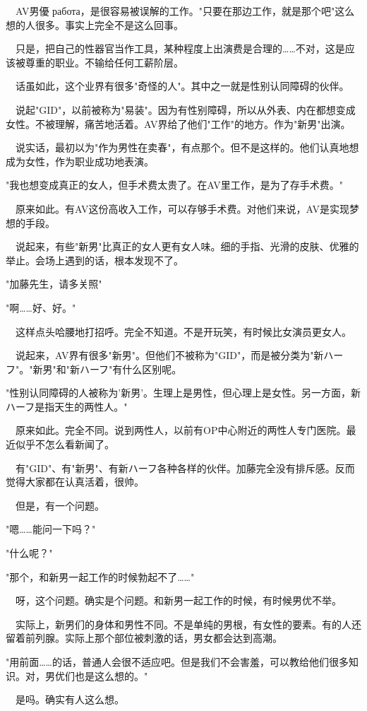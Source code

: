 \documentclass[12pt,UTF8]{ctexbook}
\begin{document}
{{　AV男優 работа，是很容易被误解的工作。"只要在那边工作，就是那个吧"这么想的人很多。事实上完全不是这么回事。

　只是，把自己的性器官当作工具，某种程度上出演费是合理的……不对，这是应该被尊重的职业。不输给任何工薪阶层。

　话虽如此，这个业界有很多"奇怪的人"。其中之一就是性别认同障碍的伙伴。

　说起"GID"，以前被称为"易装"。因为有性别障碍，所以从外表、内在都想变成女性。不被理解，痛苦地活着。AV界给了他们"工作"的地方。作为"新男"出演。

　说实话，最初以为"作为男性在卖春"，有点那个。但不是这样的。他们认真地想成为女性，作为职业成功地表演。

"我也想变成真正的女人，但手术费太贵了。在AV里工作，是为了存手术费。"

　原来如此。有AV这份高收入工作，可以存够手术费。对他们来说，AV是实现梦想的手段。

　说起来，有些"新男"比真正的女人更有女人味。细的手指、光滑的皮肤、优雅的举止。会场上遇到的话，根本发现不了。

"加藤先生，请多关照"

"啊……好、好。"

　这样点头哈腰地打招呼。完全不知道。不是开玩笑，有时候比女演员更女人。

　说起来，AV界有很多"新男"。但他们不被称为"GID"，而是被分类为"新ハーフ"。"新男"和"新ハーフ"有什么区别呢。

"性别认同障碍的人被称为'新男'。生理上是男性，但心理上是女性。另一方面，新ハーフ是指天生的两性人。"

　原来如此。完全不同。说到两性人，以前有OP中心附近的两性人专门医院。最近似乎不怎么看新闻了。

　有"GID"、有"新男"、有新ハーフ各种各样的伙伴。加藤完全没有排斥感。反而觉得大家都在认真活着，很帅。

　但是，有一个问题。

"嗯……能问一下吗？"

"什么呢？"

"那个，和新男一起工作的时候勃起不了……"

　呀，这个问题。确实是个问题。和新男一起工作的时候，有时候男优不举。

　实际上，新男们的身体和男性不同。不是单纯的男根，有女性的要素。有的人还留着前列腺。实际上那个部位被刺激的话，男女都会达到高潮。

"用前面……的话，普通人会很不适应吧。但是我们不会害羞，可以教给他们很多知识。对，男优们也是这么想的。"

　是吗。确实有人这么想。

}}
\end{document}
